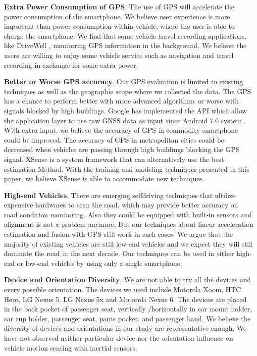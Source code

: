 
\textbf{Extra Power Consumption of GPS}. 
The use of GPS will accelerate the power consumption of the smartphone. 
We believe user experience is more important
than power consumption within vehicle, 
where the user is able to charge the smartphone. 
We find that some vehicle travel recording applications, like DriveWell \cite{cmt} , monitoring GPS information
in the background. 
We believe the users are willing to enjoy some 
vehicle service such as navigation and travel recording
in exchange for some extra power.  



\textbf{Better or Worse GPS accuracy}. 
Our GPS evaluation is limited to existing techniques as well as the
geographic scope where we collected the data. 
The GPS has a chance to perform better with more advanced algorithms
or worse with signals blocked by high buildings. 
Google has implemented the API which allow the application layer to use raw GNSS data as input
since Android 7.0 system \cite{android_gnss, google_gnss_tools}.
With extra input, we believe the accuracy of GPS in commodity 
smartphone could be improved. 
The accuracy of GPS in metropolitan cities could be decreased when vehicles are passing through high buildings blocking the GPS signal.
XSense is a system framework that can alternatively use the best estimation
Method.
With the training and modeling techniques presented in this paper, 
we believe XSense is able to accommodate new techniques.  

\textbf{High-end Vehicles}. 
There are emerging selfdriving techniques that ultilize 
expensive hardwares to scan the road, 
which may provide better accuracy on road condition
monitoring. 
Also they could be equipped with built-in sensors
and alignment is not a problem anymore. 
But our techniques about linear acceleration
estimation and fusion with GPS still work
in such cases. 
We argue that the majority of existing
vehicles are still low-end vehicles 
and we expect they will still dominate 
the road in the next decade. 
Our techniques can be used in either high-end 
or low-end vehicles by using only
a single smartphone. 


\textbf{Device and Orientation Diversity}. 
We are not able to try all the devices and 
every possible orientation. 
The devices we used include Motorola Xoom,
HTC Hero, LG Nexus 5, LG Nexus 5x and Motorola Nexus 6. 
The devices are placed in the back pocket of passenger
seat, vertically /horizontally in car mount holder, 
car cup holder, passenger seat, pants pocket, 
and passenger hand.  
We believe the diversity of devices and orientations in our study are representative enough. 
We have not observed neither particular device nor 
the orientation influence on vehicle motion sensing
with inertial sensors. 



